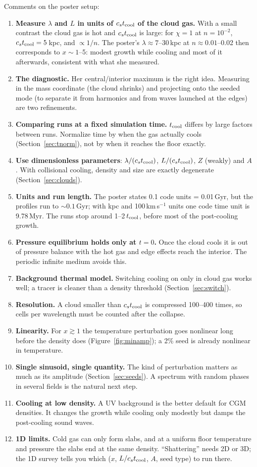 \documentclass[11pt]{article}
\newcommand{\tcool}{t_{\rm cool}}
\newcommand{\cstc}{c_s t_{\rm cool}}
\begin{document}
Comments on the poster setup:
\begin{enumerate}
\item \textbf{Measure $\lambda$ and $L$ in units of $\cstc$ of the cloud gas.} With
  a small contrast the cloud gas is hot and $\cstc$ is large: for $\chi=1$ at
  $n=10^{-2}$, $\cstc=5$\,kpc, and $\propto1/n$. The poster's $\lambda\approx7$--30\,kpc
  at $n\approx0.01$--0.02 then corresponds to $x\sim1$--5: modest growth while
  cooling and most of it afterwards, consistent with what she measured.
\item \textbf{The diagnostic.} Her central/interior maximum is the right idea.
  Measuring in the mass coordinate (the cloud shrinks) and projecting onto the
  seeded mode (to separate it from harmonics and from waves launched at the edges)
  are two refinements.
\item \textbf{Comparing runs at a fixed simulation time.} $\tcool$ differs by large
  factors between runs. Normalize time by when the gas actually cools
  (Section~\ref{sec:tnorm}), not by when it reaches the floor exactly.
\item \textbf{Use dimensionless parameters}: $\lambda/(\cstc)$, $L/(\cstc)$, $Z$
  (weakly) and $A$. With collisional cooling, density and size are exactly
  degenerate (Section~\ref{sec:clouds}).
\item \textbf{Units and run length.} The poster states 0.1 code units = 0.01\,Gyr,
  but the profiles run to $\sim0.1$\,Gyr; with kpc and 100\,km\,s$^{-1}$ units one
  code time unit is 9.78\,Myr. The runs stop around 1--2\,$\tcool$, before most of
  the post-cooling growth.
\item \textbf{Pressure equilibrium holds only at $t=0$.} Once the cloud cools it
  is out of pressure balance with the hot gas and edge effects reach the interior.
  The periodic infinite medium avoids this.
\item \textbf{Background thermal model.} Switching cooling on only in cloud gas
  works well; a tracer is cleaner than a density threshold (Section~\ref{sec:switch}).
\item \textbf{Resolution.} A cloud smaller than $\cstc$ is compressed 100--400 times,
  so cells per wavelength must be counted after the collapse.
\item \textbf{Linearity.} For $x\gtrsim1$ the temperature perturbation goes nonlinear
  long before the density does (Figure~\ref{fig:minamp}); a 2\% seed is already
  nonlinear in temperature.
\item \textbf{Single sinusoid, single quantity.} The kind of perturbation matters as
  much as its amplitude (Section~\ref{sec:seeds}). A spectrum with random phases in
  several fields is the natural next step.
\item \textbf{Cooling at low density.} A UV background is the better default for CGM
  densities. It changes the growth while cooling only modestly but damps the
  post-cooling sound waves.
\item \textbf{1D limits.} Cold gas can only form slabs, and at a uniform floor
  temperature and pressure the slabs end at the same density. ``Shattering''
  needs 2D or 3D; the 1D survey tells you which ($x$, $L/\cstc$, $A$, seed type) to
  run there.
\end{enumerate}
\end{document}
